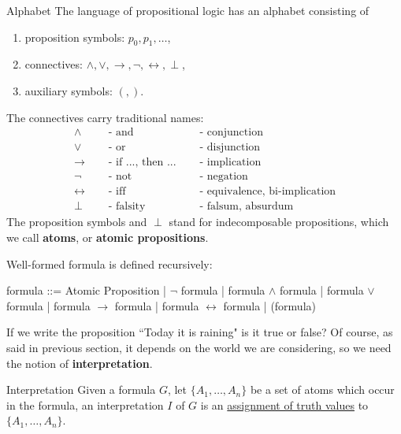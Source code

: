 \documentclass{article}
\begin{document}
\begin{Definition}{Alphabet}{}
    The language of propositional logic has an alphabet consisting of
    \begin{enumerate}
        \item proposition symbols: $p_0,p_1,\ldots$,
        \item connectives: $\land,\lor,\rightarrow,\neg,\leftrightarrow,\perp$,
        \item auxiliary symbols: $(,)$.
    \end{enumerate}
    The connectives carry traditional names:
    \begin{align*}
        \land & \quad \text{ - and} & \quad \text{ - conjunction} \\
        \lor & \quad \text{ - or} & \quad \text{ - disjunction} \\
        \rightarrow & \quad \text{ - if ..., then ...} & \quad \text{ - implication} \\
        \neg & \quad \text{ - not} & \quad \text{ - negation} \\
        \leftrightarrow & \quad \text{ - iff} & \quad \text{ - equivalence, bi-implication} \\
        \bot & \quad \text{ - falsity} & \quad \text{ - falsum, absurdum}
    \end{align*}
    The proposition symbols and $\perp$ stand for indecomposable propositions,
    which we call \textbf{atoms}, or \textbf{atomic propositions}.
\end{Definition}
\clearpage
Well-formed formula is defined recursively:
\begin{center}
    \begin{bnf}
        formula ::= Atomic Proposition
        | $\neg$ formula
        | formula $\land$ formula
        | formula $\lor$ formula
        | formula $\rightarrow$ formula
        | formula $\leftrightarrow$ formula
        | (formula)
    \end{bnf}
\end{center}
If we write the proposition ``Today it is raining" is it true or false? Of
course, as said in previous section, it depends on the world we are considering,
so we need the notion of \textbf{interpretation}.
\begin{Definition}{Interpretation}{}
    Given a formula $G$, let $\{A_1,\ldots,A_n\}$ be a set of atoms which
    occur in the formula, an interpretation $I$ of $G$ is an \underline{assignment of
    truth values} to $\{A_1,\ldots,A_n\}$.
\end{Definition}
\end{document}
